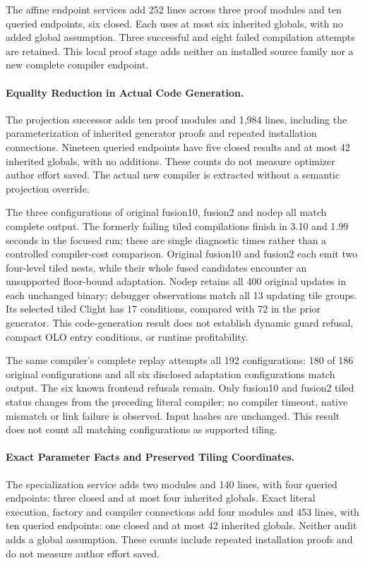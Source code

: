 The affine endpoint services add 252 lines across three proof modules and ten
queried endpoints, six closed. Each uses at most six inherited globals, with no
added global assumption. Three successful and eight failed compilation attempts
are retained. This local proof stage adds neither an installed source family
nor a new complete compiler endpoint.

\paragraph{Equality Reduction in Actual Code Generation.}
The projection successor adds ten proof modules and 1,984 lines, including the
parameterization of inherited generator proofs and repeated installation
connections. Nineteen queried endpoints have five closed results and at most
42 inherited globals, with no additions. These counts do not measure optimizer
author effort saved. The actual new compiler is extracted without a semantic
projection override.

The three configurations of original fusion10, fusion2 and nodep all match
complete output. The formerly failing tiled compilations finish in 3.10 and
1.99 seconds in the focused run; these are single diagnostic times rather than
a controlled compiler-cost comparison. Original fusion10 and fusion2 each
emit two four-level tiled nests, while their whole fused candidates encounter
an unsupported floor-bound adaptation. Nodep retains all 400 original updates
in each unchanged binary; debugger observations match all 13 updating tile
groups. Its selected tiled Clight has 17 conditions, compared with 72 in the
prior generator. This code-generation result does not establish dynamic guard
refusal, compact OLO entry conditions, or runtime profitability.

The same compiler's complete replay attempts all 192 configurations: 180 of
186 original configurations and all six disclosed adaptation configurations
match output. The six known frontend refusals remain. Only fusion10 and
fusion2 tiled status changes from the preceding literal compiler; no compiler
timeout, native mismatch or link failure is observed. Input hashes are unchanged.
This result does not count all matching configurations as supported tiling.


\paragraph{Exact Parameter Facts and Preserved Tiling Coordinates.}
The specialization service adds two modules and 140 lines, with four queried
endpoints: three closed and at most four inherited globals. Exact literal
execution, factory and compiler connections add four modules and 453 lines,
with ten queried endpoints: one closed and at most 42 inherited globals.
Neither audit adds a global assumption. These counts include repeated
installation proofs and do not measure author effort saved.

